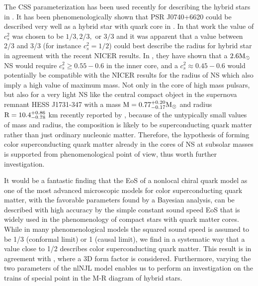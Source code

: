 \documentclass[%
 reprint,
superscriptaddress,
nofootinbib,
 amsmath,amssymb,
 aps,
]{revtex4-1}
\begin{document}
The CSS parameterization has been used recently for describing the hybrid stars in \cite{Somasundaram:2021ljr, Drischler:2020fvz}. 
It has been phenomenologically shown that PSR J0740+6620 could be described very well as a hybrid star with quark core in \cite{Somasundaram:2021ljr}. In that work the value of $c_s^2$ was chosen to be $1/3, 2/3,$ or $3/3$ and it was apparent that a value between 2/3 and 3/3 (for instance $c_s^2 = 1/2$) could best describe the radius for hybrid star in agreement with the recent NICER results. 
In \cite{Drischler:2020fvz}, they have shown that a $2.6 \textmd{M}_{\odot}$ NS would
require $c_s^2 \geq 0.55 - 0.6 $ in the inner core, and a $c_s^2 \approx 0.45 - 0.6$ would potentially be compatible with the NICER results for the radius of NS which also imply a high value of maximum mass. 
{Not only in the core of high mass pulsars, but also for a very light NS like the central compact object in the supernova remnant HESS J1731-347 with a mass $\textmd{M} = 0.77^{+0.20}_{-0.17} \textmd{M}_{\odot}$ and radius
$\textmd{R} = 10.4^{+0.86}_{-0.78}$ km recently reported by \cite{doroshenko2022strangely}, because of the untypically small values of mass and radius, the composition is likely to be superconducting quark matter rather than just ordinary nucleonic matter. Therefore, the hypothesis of forming color superconducting quark matter already in the cores of NS at subsolar masses is supported from phenomenological point of view, thus worth further investigation.}

It would be a fantastic finding that the EoS of a nonlocal chiral quark model as one of the most
advanced microscopic models for color superconducting quark matter, 
{with the favorable parameters found by a Bayesian analysis}, can be described with high
accuracy by the simple constant sound speed EoS that is widely used in the phenomenology of
compact stars with quark matter cores. While in many phenomenological models the squared sound speed is assumed to be %
1/3 (conformal limit) or 1 (causal limit), we find in a systematic way that a value close to 1/2 describes color superconducting quark matter. 
{This result is in agreement with \cite{Contrera:2022tqh}, where a 3D form factor is considered.}
{Furthermore, varying the two parameters of the nlNJL model enables us to perform an %
investigation on the trains of special point in the M-R diagram of hybrid stars.}
\end{document}
